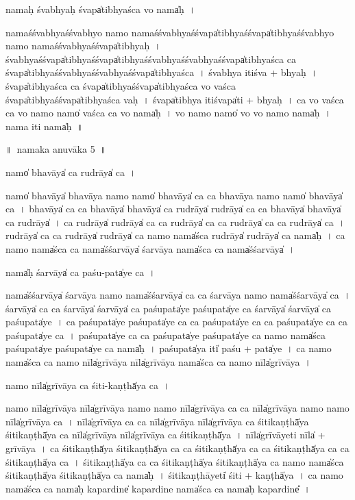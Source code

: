 \documentclass[parskip, DIV=14]{scrartcl}
\begin{document}
{nama॒ḥ śvabhya॒ḥ śvapa̍tibhyaśca vo॒ nama̍ḥ~।

nama॒śśvabhya॒śśvabhyo॒ namo॒ nama॒śśvabhya॒śśvapa̍tibhya॒śśvapa̍tibhya॒śśvabhyo॒ namo॒ nama॒śśvabhya॒śśvapa̍tibhyaḥ~।
śvabhya॒śśvapa̍tibhya॒śśvapa̍tibhya॒śśvabhya॒śśvabhya॒śśvapa̍tibhyaśca ca॒ śvapa̍tibhya॒śśvabhya॒śśvabhya॒śśvapa̍tibhyaśca~।
śvabhya॒ iti॒śva + bhya॒ḥ~।
śvapa̍tibhyaśca ca॒ śvapa̍tibhya॒śśvapa̍tibhyaśca vo vaśca॒ śvapa̍tibhya॒śśvapa̍tibhyaśca vaḥ~।
śvapa̍tibhya॒ iti॒śvapa̍ti + bhya॒ḥ~।
ca॒ vo॒ va॒śca॒ ca॒ vo॒ namo॒ namo̍ vaśca ca vo॒ nama̍ḥ~।
vo॒ namo॒ namo̍ vo vo॒ namo॒ nama̍ḥ~।
nama॒ iti॒ nama̍ḥ~॥ 

\newpage
\LARGE
॥~namaka anuvāka 5~॥ 
\Large

namo̍ bha॒vāya̍ ca ru॒drāya̍ ca॒~।

namo̍ bha॒vāya̍ bha॒vāya॒ namo॒ namo̍ bha॒vāya̍ ca ca bha॒vāya॒ namo॒ namo̍ bha॒vāya̍ ca~।
bha॒vāya̍ ca ca bha॒vāya̍ bha॒vāya̍ ca ru॒drāya̍ ru॒drāya̍ ca ca bha॒vāya̍ bha॒vāya̍ ca ru॒drāya̍~।
ca॒ ru॒drāya̍ ru॒drāya̍ ca ca ru॒drāya̍ ca ca ru॒drāya̍ ca ca ru॒drāya̍ ca~।
ru॒drāya̍ ca ca ru॒drāya̍ ru॒drāya̍ ca॒ namo॒ nama̍śca ru॒drāya̍ ru॒drāya̍ ca॒ nama̍ḥ~।
ca॒ namo॒ nama̍śca ca॒ nama̍śśa॒rvāya̍ śa॒rvāya॒ nama̍śca ca॒ nama̍śśa॒rvāya̍~।

nama̍ḥ śa॒rvāya̍ ca paśu॒-pata̍ye ca॒~।

nama̍śśa॒rvāya̍ śa॒rvāya॒ namo॒ nama̍śśa॒rvāya̍ ca ca śa॒rvāya॒ namo॒ nama̍śśa॒rvāya̍ ca~।
śa॒rvāya̍ ca ca śa॒rvāya̍ śa॒rvāya̍ ca paśu॒pata̍ye paśu॒pata̍ye ca śa॒rvāya̍ śa॒rvāya̍ ca paśu॒pata̍ye~।
ca॒ pa॒śu॒pata̍ye paśu॒pata̍ye ca ca paśu॒pata̍ye ca ca paśu॒pata̍ye ca ca paśu॒pata̍ye ca~।
pa॒śu॒pata̍ye ca ca paśu॒pata̍ye paśu॒pata̍ye ca॒ namo॒ nama̍śca paśu॒pata̍ye paśu॒pata̍ye ca॒ nama̍ḥ~।
pa॒śu॒pata̍ya॒ iti̍ paśu + pata̍ye~।
ca॒ namo॒ nama̍śca ca॒ namo॒ nīla̍grīvāya॒ nīla̍grīvāya॒ nama̍śca ca॒ namo॒ nīla̍grīvāya~।

namo॒ nīla̍grīvāya ca śiti॒-kaṇṭhā̍ya ca॒~।

namo॒ nīla̍grīvāya॒ nīla̍grīvāya॒ namo॒ namo॒ nīla̍grīvāya ca ca॒ nīla̍grīvāya॒ namo॒ namo॒ nīla̍grīvāya ca~।
nīla̍grīvāya ca ca॒ nīla̍grīvāya॒ nīla̍grīvāya ca śiti॒kaṇṭhā̍ya  śiti॒kaṇṭhā̍ya ca॒ nīla̍grīvāya॒ nīla̍grīvāya ca śiti॒kaṇṭhā̍ya~।
nīla̍grīvā॒yeti॒ nīla̍ + grī॒vā॒ya॒~।
ca॒ śi॒ti॒kaṇṭhā̍ya  śiti॒kaṇṭhā̍ya  ca ca śiti॒kaṇṭhā̍ya ca ca śiti॒kaṇṭhā̍ya  ca ca śiti॒kaṇṭhā̍ya ca~। 
śi॒ti॒kaṇṭhā̍ya ca ca śiti॒kaṇṭhā̍ya śiti॒kaṇṭhā̍ya ca॒ namo॒ nama̍śca śiti॒kaṇṭhā̍ya śiti॒kaṇṭhā̍ya ca॒ nama̍ḥ~।
śi॒ti॒kaṇṭhā॒yeti̍ śiti + kaṇṭhā̍ya~।
ca॒ namo॒ nama̍śca ca॒ nama̍ḥ kapa॒rdine̍ kapa॒rdine॒ nama̍śca ca॒ nama̍ḥ kapa॒rdine̎~।

}
\end{document}
